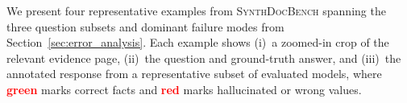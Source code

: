 \documentclass{article} %
\newcommand{\synthdocbench}[1]{\textsc{SynthDocBench}}
\begin{document}

We present four representative examples from \synthdocbench{} spanning the three
question subsets and dominant failure modes from Section~\ref{sec:error_analysis}.
Each example shows (i)~a zoomed-in crop of the relevant evidence page,
(ii)~the question and ground-truth answer, and (iii)~the annotated response from
a representative subset of evaluated models, where \textcolor{red}{\textbf{green}} marks correct facts and
\textcolor{red}{\textbf{red}} marks hallucinated or wrong values.
\newcommand{\scorehi}[1]{\colorbox{lbgreen}{\small\bfseries\texttt{#1}}}
\newcommand{\scoremid}[1]{\colorbox{localyellow}{\small\bfseries\texttt{#1}}}
\newcommand{\scorelo}[1]{\colorbox{red!18}{\small\bfseries\texttt{#1}}}
\newcommand{\cor}[1]{\textcolor{mygreen}{\textbf{#1}}}
\newcommand{\wrg}[1]{\textcolor{red}{\textbf{#1}}}

\clearpage
\end{document}

